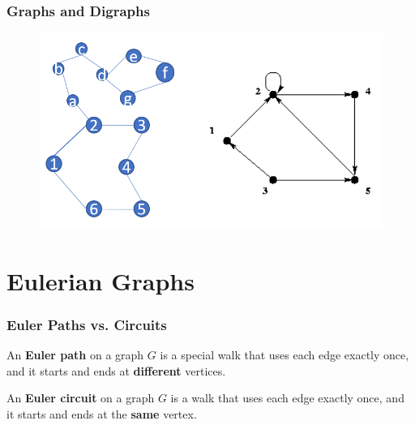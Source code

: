 \documentclass{beamer}
\begin{document}


\begin{frame}
\frametitle{Graphs and Digraphs}
\begin{figure}[h]
\includegraphics[width=\textwidth]{graphs.png}
\end{figure}
\end{frame}

\section{Eulerian Graphs}
\begin{frame}
\frametitle{Euler Paths vs. Circuits}
\begin{definition}
 An \textbf{Euler path} on a graph $G$ is a special walk that uses each edge exactly once, and it starts and ends at \textbf{different} vertices.
\end{definition}
\begin{definition}
 An \textbf{Euler circuit} on a graph $G$ is a walk that uses each edge exactly once, and it starts and ends at the \textbf{same} vertex.
\end{definition}
\end{frame}
\end{document}
